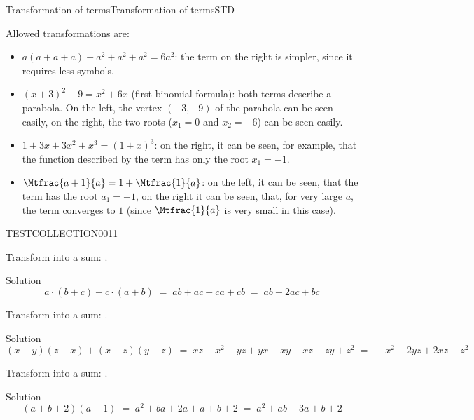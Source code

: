 \begin{MXContent}{Transformation of terms}{Transformation of terms}{STD}
\begin{MExample}
Allowed transformations are:
\begin{itemize}
\item{$a(a+a+a)+a^2+a^2+a^2 = 6a^2$: the term on the right is simpler, since it requires less symbols.}
\item{$(x+3)^2-9=x^2+6x$ (first binomial formula): both terms describe a parabola. On the left, 
the vertex $(-3,-9)$ of the parabola can be seen easily, on the right, the two roots ($x_1=0$ and $x_2=-6$)
can be seen easily.}
\item{$1+3x+3x^2+x^3=(1+x)^3$: on the right, it can be seen, for example, that the function described by the 
term has only the root $x_1=-1$.}
\item{$\Mtfrac{a+1}{a}=1+\Mtfrac{1}{a}$: on the left, it can be seen, that the term has the root $a_1=-1$, 
on the right it can be seen, that, for very large $a$, the term converges to $1$ (since $\Mtfrac{1}{a}$ is very 
small in this case).}
\end{itemize}
\end{MExample}


\begin{MExerciseCollection}{TESTCOLLECTION001}{1}

\begin{MExercise}
Transform into a sum: .
\begin{MHint}{Solution}
$$
a\cdot(b+c)+c\cdot(a+b) \;=\; a b + a c + c a + c b \;=\; a b + 2 a c + b c
$$
\end{MHint}
\end{MExercise}
\newpage

\begin{MExercise}
Transform into a sum: .
\begin{MHint}{Solution}
$$
(x-y)(z-x)+(x-z)(y-z) \;=\; x z - x^2 -y z +y x + x y - x z - z y + z^2 \;=\; -x^2 - 2 y z + 2 x z + z^2
$$
\end{MHint}
\end{MExercise}

\begin{MExercise}
Transform into a sum: .
\begin{MHint}{Solution}
$$
(a+b+2)(a+1) \;=\; a^2 + b a + 2a + a + b + 2 \;=\; a^2 + a b + 3a + b +2
$$
\end{MHint}
\end{MExercise}

\end{MExerciseCollection}




\end{MXContent}


